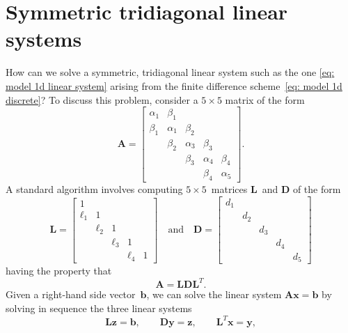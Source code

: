 \section{Symmetric tridiagonal linear systems}
\label{sec: sym tridiagonal}
How can we solve a symmetric, tridiagonal linear system such as the one
\eqref{eq: model 1d linear system} arising from the finite difference 
scheme~\eqref{eq: model 1d discrete}?  To discuss this problem, consider a 
$5\times5$ matrix of the form
\[
\boldsymbol{A}=\begin{bmatrix}
\alpha_1& \beta_1&        &        &\\
 \beta_1&\alpha_1& \beta_2&        &\\
        & \beta_2&\alpha_3&\beta_3 &\\
        &        & \beta_3&\alpha_4&\beta_4\\
        &        &        & \beta_4&\alpha_5
\end{bmatrix}.
\]
A standard algorithm involves computing $5\times5$~matrices 
$\boldsymbol{L}$~and $\boldsymbol{D}$ of the form
\[
\boldsymbol{L}=\begin{bmatrix}
     1&      &      &      &\\
\ell_1&     1&      &      &\\
      &\ell_2&     1&      &\\
      &      &\ell_3&     1&\\
      &      &      &\ell_4&1
  \end{bmatrix}
\quad\text{and}\quad
\boldsymbol{D}=\begin{bmatrix}
d_1&   &   &   &\\
   &d_2&   &   &\\
   &   &d_3&   &\\
   &   &   &d_4&\\
   &   &   &   &d_5
  \end{bmatrix}
\]
having the property that
\begin{equation}\label{eq: L D LT}
\boldsymbol{A}=\boldsymbol{L}\boldsymbol{D}\boldsymbol{L}^T.
\end{equation}
Given a right-hand side vector~$\boldsymbol{b}$, we can solve the linear system
$\boldsymbol{A}\boldsymbol{x}=\boldsymbol{b}$ by solving in sequence the three
linear systems
\begin{equation}\label{eq: LDLT systems}
\boldsymbol{L}\boldsymbol{z}=\boldsymbol{b},\qquad
\boldsymbol{D}\boldsymbol{y}=\boldsymbol{z},\qquad
\boldsymbol{L}^T\boldsymbol{x}=\boldsymbol{y},
\end{equation}
